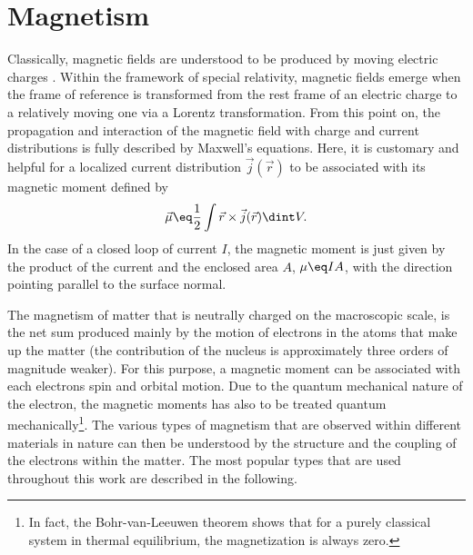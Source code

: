 \documentclass[\main/dresen_thesis.tex]{subfiles}
\begin{document}
\section{Magnetism}\label{ch:theoreticalBackground:magnetism}

  Classically, magnetic fields are understood to be produced by moving electric charges \cite{Jackson_1999_Class, Blundell_2001_Magne}.
  Within the framework of special relativity, magnetic fields emerge when the frame of reference is transformed from the rest frame of an electric charge to a relatively moving one via a Lorentz transformation.
  From this point on, the propagation and interaction of the magnetic field with charge and current distributions is fully described by Maxwell's equations.
  Here, it is customary and helpful for a localized current distribution $\vec{j}(\vec{r})$ to be associated with its magnetic moment defined by
  \begin{align}
    \vec{\mu} \eq \frac{1}{2} \int \vec{r} \times \vec{j}(\vec{r}) \dint V .
  \end{align}
  In the case of a closed loop of current $I$, the magnetic moment is just given by the product of the current and the enclosed area $A$, $\mu \eq I A$, with the direction pointing parallel to the surface normal.

  The magnetism of matter that is neutrally charged on the macroscopic scale, is the net sum produced mainly by the motion of electrons in the atoms that make up the matter (the contribution of the nucleus is approximately three orders of magnitude weaker).
  For this purpose, a magnetic moment can be associated with each electrons spin and orbital motion.
  Due to the quantum mechanical nature of the electron, the magnetic moments has also to be treated quantum mechanically\footnote{In fact, the Bohr-van-Leeuwen theorem shows that for a purely classical system in thermal equilibrium, the magnetization is always zero.}.
  The various types of magnetism that are observed within different materials in nature can then be understood by the structure and the coupling of the electrons within the matter.
  The most popular types that are used throughout this work are described in the following.
\end{document}

